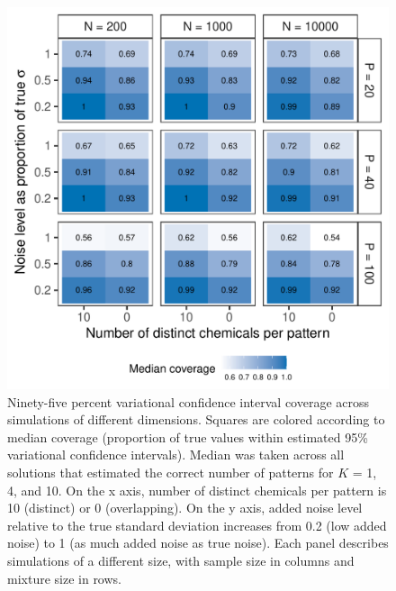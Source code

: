 {\begin{figure}[!htbp]
\caption[Variational coverage for secondary simulations across dimension]{Ninety-five percent variational confidence interval coverage across simulations of different dimensions. Squares are colored according to median coverage (proportion of true values within estimated 95\% variational confidence intervals). Median was taken across all solutions that estimated the correct number of patterns for $K$ = 1, 4, and 10. On the x axis, number of distinct chemicals per pattern is 10 (distinct) or 0 (overlapping). On the y axis, added noise level relative to the true standard deviation increases from 0.2 (low added noise) to 1 (as much added noise as true noise). Each panel describes simulations of a different size, with sample size in columns and mixture size in rows.}
\label{fig:dim_coverage}
\centering
\includegraphics[scale = 0.8]{./figures/coverage_dim_np.pdf}
\end{figure}

}
